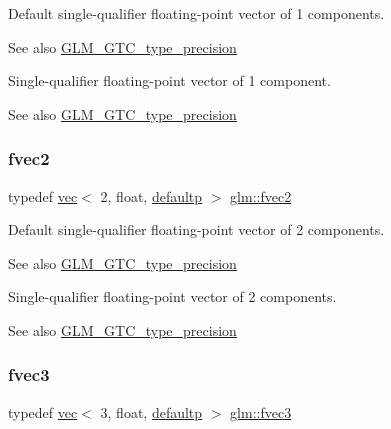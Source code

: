 Default single-\/qualifier floating-\/point vector of 1 components. \begin{DoxySeeAlso}{See also}
\mbox{\hyperlink{group__gtc__type__precision}{G\+L\+M\+\_\+\+G\+T\+C\+\_\+type\+\_\+precision}}
\end{DoxySeeAlso}
Single-\/qualifier floating-\/point vector of 1 component. \begin{DoxySeeAlso}{See also}
\mbox{\hyperlink{group__gtc__type__precision}{G\+L\+M\+\_\+\+G\+T\+C\+\_\+type\+\_\+precision}} 
\end{DoxySeeAlso}
\mbox{\label{group__gtc__type__precision_gaabc3d7a259968a12108c052ff9265148}} 
\subsubsection{\texorpdfstring{fvec2}{fvec2}}
{\footnotesize\ttfamily typedef \mbox{\hyperlink{structglm_1_1vec}{vec}}$<$ 2, float, \mbox{\hyperlink{namespaceglm_a36ed105b07c7746804d7fdc7cc90ff25a9d21ccd8b5a009ec7eb7677befc3bf51}{defaultp}} $>$ \mbox{\hyperlink{group__gtc__type__precision_gaabc3d7a259968a12108c052ff9265148}{glm\+::fvec2}}}

Default single-\/qualifier floating-\/point vector of 2 components. \begin{DoxySeeAlso}{See also}
\mbox{\hyperlink{group__gtc__type__precision}{G\+L\+M\+\_\+\+G\+T\+C\+\_\+type\+\_\+precision}}
\end{DoxySeeAlso}
Single-\/qualifier floating-\/point vector of 2 components. \begin{DoxySeeAlso}{See also}
\mbox{\hyperlink{group__gtc__type__precision}{G\+L\+M\+\_\+\+G\+T\+C\+\_\+type\+\_\+precision}} 
\end{DoxySeeAlso}
\mbox{\label{group__gtc__type__precision_gaf7cdc93898ec0c11f1cff54bd72d022b}} 
\subsubsection{\texorpdfstring{fvec3}{fvec3}}
{\footnotesize\ttfamily typedef \mbox{\hyperlink{structglm_1_1vec}{vec}}$<$ 3, float, \mbox{\hyperlink{namespaceglm_a36ed105b07c7746804d7fdc7cc90ff25a9d21ccd8b5a009ec7eb7677befc3bf51}{defaultp}} $>$ \mbox{\hyperlink{group__gtc__type__precision_gaf7cdc93898ec0c11f1cff54bd72d022b}{glm\+::fvec3}}}

